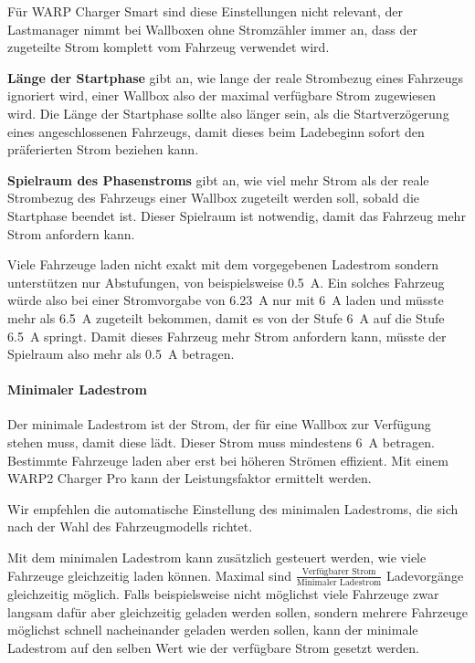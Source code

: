 \documentclass[a4paper,10pt]{article}
\newcommand{\hint}[1]{\begin{tcolorbox}[colback=boxgray,colframe=black,coltext=
white,title=Hinweis,left*=2mm,right*=2mm,boxsep=1mm,bottom=1mm,top=1mm]#1\end{tcolorbox}}
\begin{document}
\begin{multicols*}{2}
    Für WARP Charger Smart sind diese Einstellungen nicht relevant,
    der Lastmanager nimmt bei Wallboxen ohne Stromzähler immer an, dass der zugeteilte Strom komplett vom Fahrzeug verwendet wird.

    \textbf{Länge der Startphase} gibt an, wie lange der reale Strombezug eines Fahrzeugs ignoriert wird,
    einer Wallbox also der maximal verfügbare Strom zugewiesen wird. Die Länge der Startphase sollte also
    länger sein, als die Startverzögerung eines angeschlossenen Fahrzeugs, damit dieses beim Ladebeginn
    sofort den präferierten Strom beziehen kann.

    \textbf{Spielraum des Phasenstroms} gibt an, wie viel mehr Strom als der reale Strombezug des Fahrzeugs
    einer Wallbox zugeteilt werden soll, sobald die Startphase beendet ist. Dieser Spielraum ist notwendig, damit
    das Fahrzeug mehr Strom anfordern kann.

    Viele Fahrzeuge laden nicht exakt mit dem vorgegebenen Ladestrom sondern unterstützen nur Abstufungen, von beispielsweise \SI{0,5}{\ampere}.
    Ein solches Fahrzeug würde also bei einer Stromvorgabe von \SI{6,23}{\ampere} nur mit \SI{6}{\ampere} laden und müsste mehr als \SI{6,5}{\ampere} zugeteilt bekommen, damit es von der Stufe \SI{6}{\ampere} auf die Stufe \SI{6,5}{\ampere} springt.
    Damit dieses Fahrzeug mehr Strom anfordern kann, müsste der Spielraum also mehr als \SI{0,5}{\ampere} betragen.

    \paragraph{Minimaler Ladestrom}
    Der minimale Ladestrom ist der Strom, der für eine Wallbox zur Verfügung stehen muss, damit diese lädt. Dieser Strom muss mindestens \SI{6}{\ampere} betragen.
    Bestimmte Fahrzeuge laden aber erst bei höheren Strömen effizient. Mit einem WARP2 Charger Pro kann der Leistungsfaktor ermittelt werden.

    \hint{Wir empfehlen die automatische Einstellung des minimalen Ladestroms, die sich nach der Wahl des Fahrzeugmodells richtet.}

    Mit dem minimalen Ladestrom kann zusätzlich gesteuert werden, wie viele Fahrzeuge gleichzeitig laden können.
    Maximal sind $\frac{\text{Verfügbarer Strom}}{\text{Minimaler Ladestrom}}$ Ladevorgänge gleichzeitig möglich. Falls beispielsweise nicht möglichst viele
    Fahrzeuge zwar langsam dafür aber gleichzeitig geladen werden sollen, sondern mehrere Fahrzeuge möglichst schnell nacheinander geladen werden sollen, kann der minimale Ladestrom auf den selben Wert
    wie der verfügbare Strom gesetzt werden.


\end{multicols*}
\end{document}
